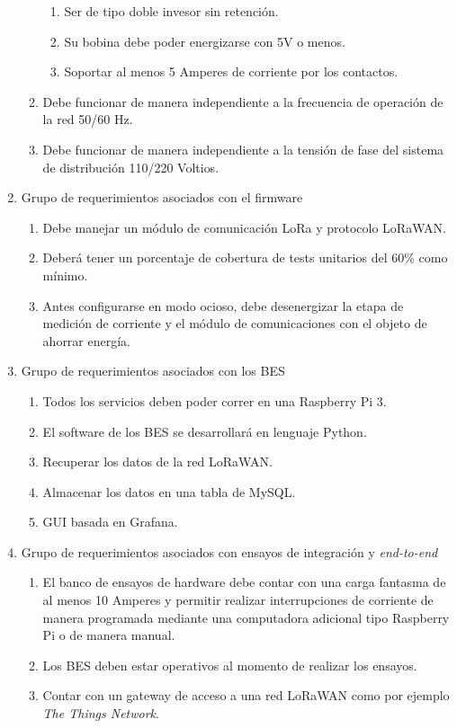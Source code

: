 \documentclass[11pt]{charter}
\begin{document}
\begin{enumerate}
\begin{enumerate}
\begin{enumerate}[label*=\arabic*.]
		\item Ser de tipo doble invesor sin retención.
		\item Su bobina debe poder energizarse con 5V o menos.
		\item Soportar al menos 5 Amperes de corriente por los contactos.
	\end{enumerate} 
	\item Debe funcionar de manera independiente a la frecuencia de operación de la red 50/60 Hz.
	\item Debe funcionar de manera independiente a la tensión de fase del sistema de distribución 110/220 Voltios.
	\end{enumerate}
	
\item Grupo de requerimientos asociados con el firmware
	\begin{enumerate}
	\item Debe manejar un módulo de comunicación LoRa y protocolo LoRaWAN.
	\item Deberá tener un porcentaje de cobertura de tests unitarios del 60\% como mínimo.
	\item Antes configurarse en modo ocioso, debe desenergizar la etapa de medición de corriente y el módulo de comunicaciones con el objeto de ahorrar energía.
	\end{enumerate}
	
\item Grupo de requerimientos asociados con los BES
	\begin{enumerate}
		\item Todos los servicios deben poder correr en una Raspberry Pi 3.
		\item El software de los BES se desarrollará en lenguaje Python.
		\item Recuperar los datos de la red LoRaWAN.
		\item Almacenar los datos en una tabla de MySQL.
		\item GUI basada en Grafana.
	\end{enumerate}

\item Grupo de requerimientos asociados con ensayos de integración y \textit{end-to-end}
	\begin{enumerate}
		\item El banco de ensayos de hardware debe contar con una carga fantasma de al menos 10 Amperes y permitir realizar interrupciones de corriente de manera programada mediante una computadora adicional tipo Raspberry Pi o de manera manual.
		\item Los BES deben estar operativos al momento de realizar los ensayos.
		\item Contar con un gateway de acceso a una red LoRaWAN como por ejemplo \textit{The Things Network}.
	\end{enumerate}
\end{enumerate}
\end{document}
